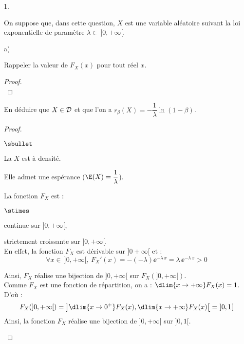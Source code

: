\documentclass[11pt]{article}%
\begin{document}
\begin{noliste}{1.}
  \setlength{\itemsep}{4mm}
  \setcounter{enumi}{1}
  \item On suppose que, dans cette question, $X$ est une variable 
  aléatoire suivant la loi exponentielle de paramètre $\lambda \in 
  \ ]0,+\infty[$.
  \begin{noliste}{a)}
    \setlength{\itemsep}{2mm}
    \item Rappeler la valeur de $F_X(x)$ pour tout réel $x$.
    
    \begin{proof}~
      ~\\[-1cm]
    \end{proof}

    
    \item En déduire que $X \in {\cal D}$ et que l'on a 
    $r_\beta(X)=-\dfrac1\lambda \ln(1-\beta)$.
    
    \begin{proof}~
      \begin{noliste}{$\sbullet$}
	\item La \var $X$ est à densité.
	\item Elle admet une espérance ($\E(X) = \dfrac{1}{\lambda}$).
	
	
	\newpage
	
	
	\item La fonction $F_X$ est :
	\begin{noliste}{$\stimes$}
	  \item continue sur $]0,+\infty[$,
	  \item strictement croissante sur $]0,+\infty[$.\\
	  En effet, la fonction $F_X$ est dérivable sur 
	  $]0+\infty[$ et :
	  \[
	    \forall x \in \ ]0,+\infty[, \ 
	    F_X'(x) = -(-\lambda) \ee^{-\lambda \, x} = 
	    \lambda \, \ee^{-\lambda \, x} >0
	  \]
	\end{noliste}
	Ainsi, $F_X$ réalise une bijection de $]0,+\infty[$ sur 
	$F_X(]0,+\infty[)$.\\
	Comme $F_X$ est une fonction de répartition, on a :
	$\dlim{x\to +\infty} F_X(x)=1$.\\
	D'où :
	\[
	  F_X(]0,+\infty[) = \left] \dlim{x\to 0^+} F_X(x), 
	  \dlim{x\to +\infty} F_X(x) \right[ = \ ]0,1[
	\]
	Ainsi, la fonction $F_X$ réalise une bijection de 
	$]0,+\infty[$ sur $]0,1[$.
      \end{noliste}
      

\end{proof}
\end{noliste}
\end{noliste}
\end{document}
